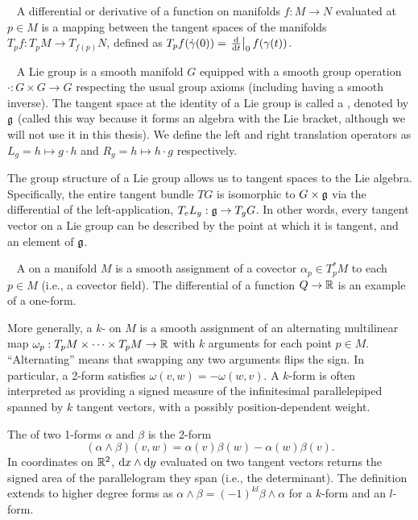 \label{notion:differential}~\cite[p.\ 55]{leeSmoothManifolds2013} A differential or derivative of a function on manifolds $f : M \to N$ evaluated at $p \in M$ is a mapping between the tangent spaces of the manifolds $T_p f : T_p M \to T_{f(p)} N$, defined  as $T_p f (\dot{\gamma}(0)) = \odv{}{t}_0 f(\gamma(t))$.

~\cite[\S7]{leeSmoothManifolds2013} A Lie group is a smooth manifold $G$ equipped with a smooth group operation $\cdot : G \times G \to G$ respecting the usual group axioms (including having a smooth inverse). The tangent space at the identity of a Lie group is called a , denoted by ${\mathfrak{g}}$ (called this way because it forms an algebra with the Lie bracket, although we will not use it in this thesis). We define the left and right translation operators as $L_g = h \mapsto g \cdot h$ and $R_g = h \mapsto h \cdot g$ respectively.

\label{notion:lie-algebra-trivialization} The group structure of a Lie group allows us to  tangent spaces to the Lie algebra. Specifically, the entire tangent bundle $TG$ is isomorphic to $G \times {\mathfrak{g}}$ via the differential of the left-application, $T_e L_g : {\mathfrak{g}} \to T_g G$. In other words, every tangent vector on a Lie group can be described by the point at which it is tangent, and an element of ${\mathfrak{g}}$.

\label{notion:differential-forms}~\cite[\S14]{leeSmoothManifolds2013} A  on a manifold $M$ is a smooth assignment of a covector $\alpha_p \in T_p^* M$ to each $p \in M$ (i.e., a covector field). The differential of a function $Q \to {\mathbb{R}}$ is an example of a one-form.

More generally, a $k$- on $M$ is a smooth assignment of an alternating multilinear map $\omega_p : T_p M \times \cdots \times T_p M \to {\mathbb{R}}$ with $k$ arguments for each point $p \in M$. ``Alternating'' means that swapping any two arguments flips the sign. In particular, a 2-form satisfies $\omega(v, w) = - \omega(w, v)$. A $k$-form is often interpreted as providing a signed measure of the infinitesimal parallelepiped spanned by $k$ tangent vectors, with a possibly position-dependent weight.

 The  of two 1-forms $\alpha$ and $\beta$ is the 2-form
\[ (\alpha \wedge \beta)(v, w) = \alpha(v) \beta(w) - \alpha(w) \beta(v). \]
In coordinates on ${\mathbb{R}}^2$, $\odif{x} \wedge \odif{y}$ evaluated on two tangent vectors returns the signed area of the parallelogram they span (i.e., the determinant). The definition extends to higher degree forms as $\alpha \wedge \beta = (-1)^{k l} \beta \wedge \alpha$ for a $k$-form and an $l$-form.

